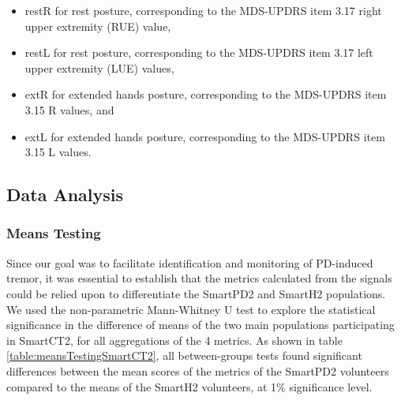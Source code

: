 \begin{itemize}
\item restR for rest posture, corresponding to the \gls{MDS}-\gls{UPDRS} item 3.17 right upper extremity (\gls{RUE}) value,
\item restL for rest posture, corresponding to the \gls{MDS}-\gls{UPDRS} item 3.17 left upper extremity (\gls{LUE}) values,
\item extR for extended hands posture, corresponding to the \gls{MDS}-\gls{UPDRS} item 3.15 R values, and
\item extL for extended hands posture, corresponding to the \gls{MDS}-\gls{UPDRS} item 3.15 L values. 
\end{itemize}

\subsection{Data Analysis}
\label{subsec:SmartCT2Analysis}
\subsubsection{Means Testing}
\label{subsubsec:SmartCT2MeansTesting}
Since our goal was to facilitate identification and monitoring of \gls{PD}-induced tremor, it was essential to establish that the metrics calculated from the signals could be relied upon to differentiate the \gls{SmartPD2} and \gls{SmartH2} populations. We used the non-parametric Mann-Whitney U test to explore the statistical significance in the difference of means of the two main populations participating in \gls{SmartCT2}, for all aggregations of the 4 metrics. As shown in table \ref{table:meansTestingSmartCT2}, all between-groups tests found significant differences between the mean scores of the metrics of the \gls{SmartPD2} volunteers compared to the means of the \gls{SmartH2} volunteers, at 1\% significance level.  

